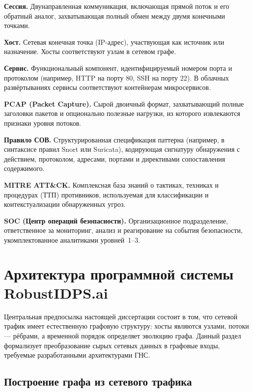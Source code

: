 \noindent\textbf{Сессия.} Двунаправленная коммуникация, включающая прямой поток и его обратный аналог, захватывающая полный обмен между двумя конечными точками.

\noindent\textbf{Хост.} Сетевая конечная точка (IP-адрес), участвующая как источник или назначение. Хосты соответствуют узлам в сетевом графе.

\noindent\textbf{Сервис.} Функциональный компонент, идентифицируемый номером порта и протоколом (например, HTTP на порту 80, SSH на порту 22). В облачных развёртываниях сервисы соответствуют контейнерам микросервисов.

\noindent\textbf{PCAP (Packet Capture).} Сырой двоичный формат, захватывающий полные заголовки пакетов и опционально полезные нагрузки, из которого извлекаются признаки уровня потоков.

\noindent\textbf{Правило СОВ.} Структурированная спецификация паттерна (например, в синтаксисе правил Snort или Suricata), кодирующая сигнатуру обнаружения с действием, протоколом, адресами, портами и директивами сопоставления содержимого.

\noindent\textbf{MITRE ATT\&CK.} Комплексная база знаний о тактиках, техниках и процедурах (ТТП) противников, используемая для классификации и контекстуализации обнаруженных угроз.

\noindent\textbf{SOC (Центр операций безопасности).} Организационное подразделение, ответственное за мониторинг, анализ и реагирование на события безопасности, укомплектованное аналитиками уровней~1--3.


\section{Архитектура программной системы RobustIDPS.ai}
\label{sec:data_to_graph}

Центральная предпосылка настоящей диссертации состоит в том, что сетевой трафик имеет естественную графовую структуру: хосты являются узлами, потоки --- рёбрами, а временной порядок определяет эволюцию графа. Данный раздел формализует преобразование сырых сетевых данных в графовые входы, требуемые разработанными архитектурами ГНС.

\subsection{Построение графа из сетевого трафика}

